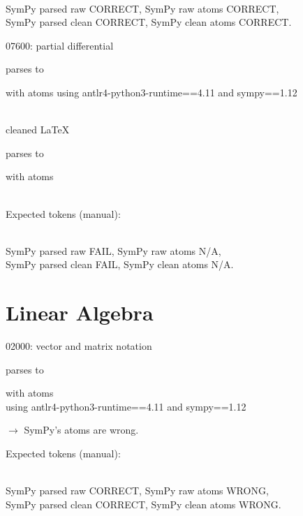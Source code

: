 \documentclass{article}
\begin{document}
\ \\
SymPy parsed raw CORRECT, 
SymPy raw atoms CORRECT, \\
SymPy parsed clean CORRECT, 
SymPy clean atoms CORRECT.

\hrulefill

07600:
partial differential

parses to

with atoms
using antlr4-python3-runtime==4.11 and sympy==1.12

\ \\
cleaned \LaTeX

parses to

with atoms


\ \\
Expected tokens (manual):


\ \\
SymPy parsed raw FAIL, 
SymPy raw atoms N/A, \\
SymPy parsed clean FAIL, 
SymPy clean atoms N/A.

\hrulefill


\section{Linear Algebra}

02000:
vector and matrix notation
    
parses to

with atoms 
\\
using antlr4-python3-runtime==4.11 and sympy==1.12

$\rightarrow$ SymPy's atoms are wrong.

Expected tokens (manual): 


\ \\
SymPy parsed raw CORRECT, 
SymPy raw atoms WRONG, \\
SymPy parsed clean CORRECT, 
SymPy clean atoms WRONG.

\hrulefill
\end{document}
